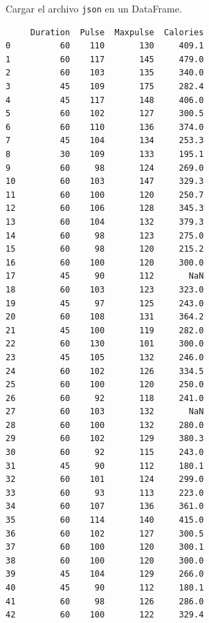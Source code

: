 \begin{code} Cargar el archivo \texttt{json} en un DataFrame.

\begin{Shaded}
\begin{Highlighting}[]

\OperatorTok{=}\NormalTok{)}

\end{Highlighting}
\end{Shaded}

\begin{verbatim}
     Duration  Pulse  Maxpulse  Calories
0          60    110       130     409.1
1          60    117       145     479.0
2          60    103       135     340.0
3          45    109       175     282.4
4          45    117       148     406.0
5          60    102       127     300.5
6          60    110       136     374.0
7          45    104       134     253.3
8          30    109       133     195.1
9          60     98       124     269.0
10         60    103       147     329.3
11         60    100       120     250.7
12         60    106       128     345.3
13         60    104       132     379.3
14         60     98       123     275.0
15         60     98       120     215.2
16         60    100       120     300.0
17         45     90       112       NaN
18         60    103       123     323.0
19         45     97       125     243.0
20         60    108       131     364.2
21         45    100       119     282.0
22         60    130       101     300.0
23         45    105       132     246.0
24         60    102       126     334.5
25         60    100       120     250.0
26         60     92       118     241.0
27         60    103       132       NaN
28         60    100       132     280.0
29         60    102       129     380.3
30         60     92       115     243.0
31         45     90       112     180.1
32         60    101       124     299.0
33         60     93       113     223.0
34         60    107       136     361.0
35         60    114       140     415.0
36         60    102       127     300.5
37         60    100       120     300.1
38         60    100       120     300.0
39         45    104       129     266.0
40         45     90       112     180.1
41         60     98       126     286.0
42         60    100       122     329.4

\end{verbatim}
\end{code}
